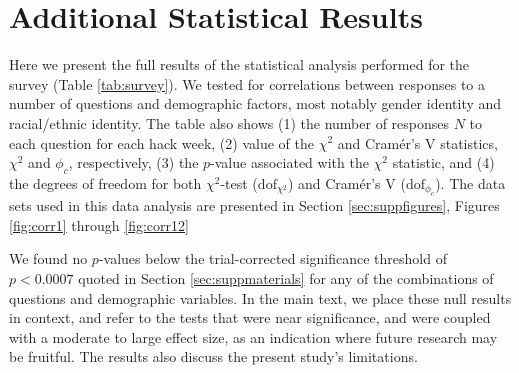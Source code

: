 \documentclass{aastex62}
\begin{document}
\clearpage

\section{Additional Statistical Results}

Here we present the full results of the statistical analysis performed for the survey (Table \ref{tab:survey}). We tested for correlations between responses to a number of questions and demographic factors, most notably gender identity and racial/ethnic identity. The table also shows (1) the number of responses $N$ to each question for each hack week, (2) value of the $\chi^2$ and Cram\'{e}r's V statistics, $\chi^2$ and $\phi_c$, respectively, (3) the $p$-value associated with the $\chi^2$ statistic, and (4) the degrees of freedom for both $\chi^2$-test ($\mathrm{dof}_{\chi^2}$) and Cram\'{e}r's V ($\mathrm{dof}_{\phi_c}$). The data sets used in this data analysis are presented in Section \ref{sec:suppfigures}, Figures \ref{fig:corr1} through \ref{fig:corr12}

We found no $p$-values below the trial-corrected significance threshold of $p < 0.0007$ quoted in Section \ref{sec:suppmaterials} for any of the combinations of questions and demographic variables. In the main text, we place these null results in context, and refer to the tests that were near significance, and were coupled with a moderate to large effect size, as an indication where future research may be fruitful. The results also discuss the present study's limitations.
\end{document}
